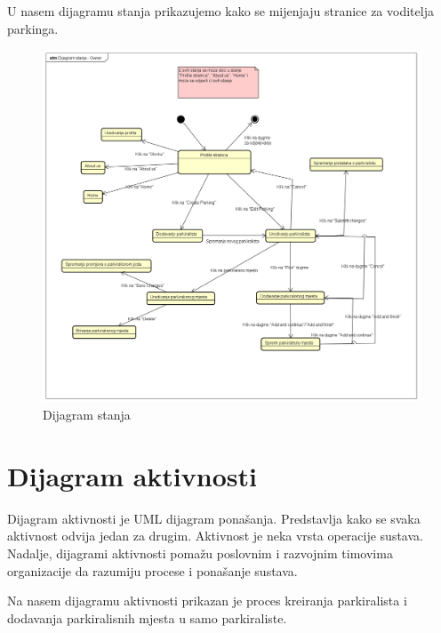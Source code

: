 U nasem dijagramu stanja prikazujemo kako se mijenjaju stranice za voditelja parkinga.
\begin{figure}[H]
	
	\includegraphics[width=\textwidth]{slike/Dijagram stanja - Owner.png} %
	\centering
	\caption{Dijagram stanja}
	\label{fig:dijastan}
\end{figure}

\eject 

\section{Dijagram aktivnosti}

Dijagram aktivnosti je UML dijagram ponašanja. Predstavlja kako se svaka aktivnost odvija jedan za drugim. Aktivnost je neka vrsta operacije sustava. 
Nadalje, dijagrami aktivnosti pomažu poslovnim i razvojnim timovima organizacije da razumiju procese i ponašanje sustava.

Na nasem dijagramu aktivnosti prikazan je proces kreiranja parkiralista i dodavanja parkiralisnih mjesta u samo parkiraliste.

